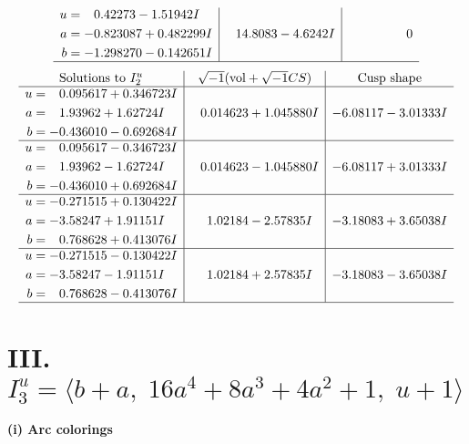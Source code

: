 \documentclass[1p]{elsarticle_modified}
\theoremstyle{definition}
\newcommand{\I}{\sqrt{-1}}
\begin{document}
$$\begin{array}{c|c|c}
\begin{aligned}
u &= \phantom{-}0.42273 - 1.51942 I \\
a &= -0.823087 + 0.482299 I \\
b &= -1.298270 - 0.142651 I\end{aligned}
 & \phantom{-}14.8083 - 4.6242 I & \phantom{-0.000000 } 0\\
 \hline 
 \end{array}$$\newpage$$\begin{array}{c|c|c}  
\text{Solutions to }I^u_{2}& \I (\text{vol} + \sqrt{-1}CS) & \text{Cusp shape}\\
 \hline 
\begin{aligned}
u &= \phantom{-}0.095617 + 0.346723 I \\
a &= \phantom{-}1.93962 + 1.62724 I \\
b &= -0.436010 - 0.692684 I\end{aligned}
 & \phantom{-}0.014623 + 1.045880 I & -6.08117 - 3.01333 I \\ \hline\begin{aligned}
u &= \phantom{-}0.095617 - 0.346723 I \\
a &= \phantom{-}1.93962 - 1.62724 I \\
b &= -0.436010 + 0.692684 I\end{aligned}
 & \phantom{-}0.014623 - 1.045880 I & -6.08117 + 3.01333 I \\ \hline\begin{aligned}
u &= -0.271515 + 0.130422 I \\
a &= -3.58247 + 1.91151 I \\
b &= \phantom{-}0.768628 + 0.413076 I\end{aligned}
 & \phantom{-}1.02184 - 2.57835 I & -3.18083 + 3.65038 I \\ \hline\begin{aligned}
u &= -0.271515 - 0.130422 I \\
a &= -3.58247 - 1.91151 I \\
b &= \phantom{-}0.768628 - 0.413076 I\end{aligned}
 & \phantom{-}1.02184 + 2.57835 I & -3.18083 - 3.65038 I\\
 \hline 
 \end{array}$$\newpage\newpage\renewcommand{\arraystretch}{1}
\centering \section*{III. $I^u_{3}= \langle b+a,\;16 a^4+8 a^3+4 a^2+1,\;u+1 \rangle$}
\flushleft \textbf{(i) Arc colorings}\\
\end{document}
